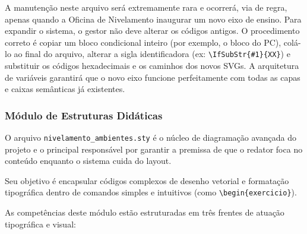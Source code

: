 A manutenção neste arquivo será extremamente rara e ocorrerá, via de regra, apenas quando a Oficina de Nivelamento inaugurar um novo eixo de ensino. Para expandir o sistema, o gestor não deve alterar os códigos antigos. O procedimento correto é copiar um bloco condicional inteiro (por exemplo, o bloco do PC), colá-lo ao final do arquivo, alterar a sigla identificadora (ex: \verb|\IfSubStr{#1}{XX}|) e substituir os códigos hexadecimais e os caminhos dos novos SVGs. A arquitetura de variáveis garantirá que o novo eixo funcione perfeitamente com todas as capas e caixas semânticas já existentes.


\subsubsection{Módulo de Estruturas Didáticas}

O arquivo \texttt{nivelamento\_ambientes.sty} é o núcleo de diagramação avançada do projeto e o principal responsável por garantir a premissa de que o redator foca no conteúdo enquanto o sistema cuida do layout.

Seu objetivo é encapsular códigos complexos de desenho vetorial e formatação tipográfica dentro de comandos simples e intuitivos (como \verb|\begin{exercicio}|). 

As competências deste módulo estão estruturadas em três frentes de atuação tipográfica e visual:

